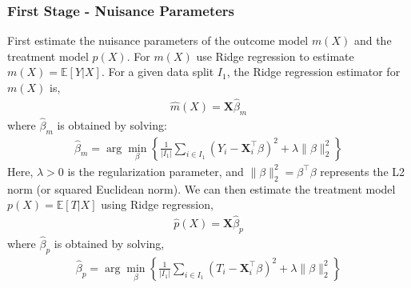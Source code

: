 \subsubsection{First Stage - Nuisance Parameters}
First estimate the nuisance parameters of the outcome model \(m(X)\) and the treatment model \(p(X)\).
For \(m(X)\) use Ridge regression to estimate \(m(X) = \mathbb{E}[Y | X]\). For a given data split \(I_1\), the Ridge regression estimator for \(m(X)\) is,
\begin{align}
\hat{m}(X) = \mathbf{X} \hat{\beta}_m
\end{align}
where \(\hat{\beta}_m\) is obtained by solving:
\begin{align}
\hat{\beta}_m = \arg\min_{\beta} \left\{ \frac{1}{|I_1|} \sum_{i \in I_1} (Y_i - \mathbf{X}_i^\top \beta)^2 + \lambda \|\beta\|_2^2 \right\}
\end{align}
Here, \(\lambda > 0\) is the regularization parameter, and \(\|\beta\|_2^2 = \beta^\top \beta\) represents the L2 norm (or squared Euclidean norm).
We can then estimate the treatment model \(p(X) = \mathbb{E}[T | X]\) using Ridge regression,
\begin{align}
\hat{p}(X) = \mathbf{X} \hat{\beta}_p
\end{align}
where \(\hat{\beta}_p\) is obtained by solving,
\begin{align}
\hat{\beta}_p = \arg\min_{\beta} \left\{ \frac{1}{|I_1|} \sum_{i \in I_1} (T_i - \mathbf{X}_i^\top \beta)^2 + \lambda \|\beta\|_2^2 \right\}
\end{align}
